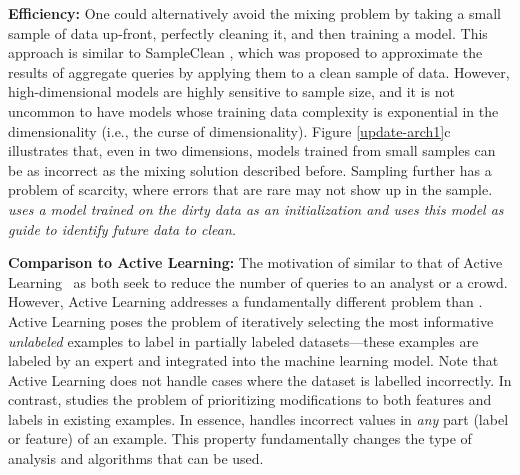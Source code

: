 \vspace{0.5em}
\noindent \textbf{Efficiency: } One could alternatively avoid the mixing problem by taking a small sample of data up-front, perfectly cleaning it, and then training a model.
This approach is similar to SampleClean \cite{wang1999sample}, which was proposed to approximate the results of aggregate queries by applying them to a clean sample of data.
However, high-dimensional models are highly sensitive to sample size, and it is not uncommon to have models whose training data complexity is exponential in the dimensionality (i.e., the curse of dimensionality).
Figure \ref{update-arch1}c illustrates that, even in two dimensions, models trained from small samples can be as incorrect as the mixing solution described before.
Sampling further has a problem of scarcity, where errors that are rare may not show up in the sample.
\emph{\sys uses a model trained on the dirty data as an initialization and uses this model as guide to identify future data to clean.}

\vspace{0.5em}
\noindent \textbf{Comparison to Active Learning: } The motivation of \sys similar to that of Active Learning~\cite{DBLP:journals/pvldb/YakoutENOI11,gokhale2014corleone} as both seek to reduce the number of queries to an analyst or a crowd.
However, Active Learning addresses a fundamentally different problem than \sys.
Active Learning poses the problem of iteratively selecting the most informative {\it unlabeled} examples to label in partially labeled datasets---these
examples are labeled by an expert and integrated into the machine learning model.
Note that Active Learning does not handle cases where the dataset is labelled incorrectly.
In contrast, \sys studies the problem of prioritizing modifications to both features and labels in existing examples.
In essence, \sys handles incorrect values in {\it any} part (label or feature) of an example.
This property fundamentally changes the type of analysis and algorithms that can be used.





